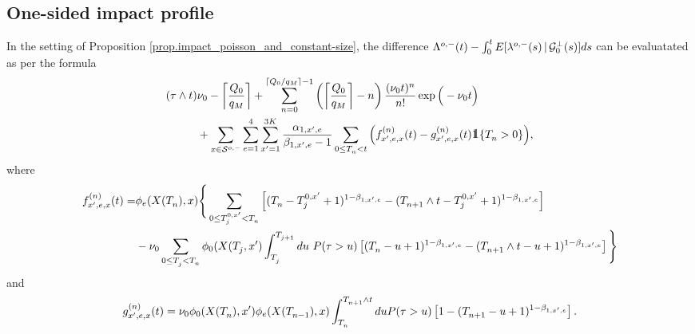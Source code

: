 \documentclass[10pt, article,table]{article}
\begin{document}
\newpage

\subsection{One-sided impact profile}
\begin{lemma}\label{lemma.implementation_of_one-sided_impact}
 In the setting of Proposition \ref{prop.impact_poisson_and_constant-size}, the difference $\weakDeflCompensator(t) - \intzerot \Expectation[\weakDeflIntensity(s)\,\vert\,\sigmaAlgebraG_{0}\orthogonal(s)]ds$ can be evaluatated as per the formula
 \begin{equation}\label{eq.evaluation_of_one-sided_impact}
 \begin{split}
  (\terminationTime\wedge t) &\baseRate_{0}
  - \left\lceil \frac{\metaorderSize}{q_{M}}\right\rceil
  + \sum_{n=0}^{\lceil\metaorderSize/q_{M}\rceil -1}
  \left( \left\lceil \frac{\metaorderSize}{q_{M}}\right\rceil - n\right)\frac{(\baseRate_{0} t)^n}{n!} \exp \Big( - \baseRate_{0} t \Big)
  \\
  &+
  \sum_{x\in\weakDeflSpace}\sum_{e=1}^{4}\sum_{\xone=1}^{3K}
  \frac{\impCoef_{1,\xone,e}}{\decCoef_{1,\xone,e} -1}
  \sum_{0\leq \arrivalTimes[]_n < t}
  \Big(
  f^{(n)}_{\xone,e,x}(t) - g^{(n)}_{\xone,e,x}(t) \one\lbrace \arrivalTimes[]_n >0\rbrace
  \Big),
  \end{split}
 \end{equation}
where 
\begin{equation*}
\begin{split}
 f^{(n)}_{\xone,e,x} (t)
 =&
 \transProb_{e} (\stateVariable(\arrivalTimes[]_n),x)
 \Bigg\lbrace
 \sum_{0\leq \arrivalTimes[0,\xone]_j < \arrivalTimes[]_n}
 \left[
 (\arrivalTimes[]_n - \arrivalTimes[0,\xone]_j +1)^{1-\decCoef_{1,\xone,e}}
 -
 (\arrivalTimes[]_{n+1}\wedge t - \arrivalTimes[0,\xone]_j +1)^{1-\decCoef_{1,\xone,e}}
 \right]
 \\
 &-
 \baseRate_{0} \sum_{0\leq \arrivalTimes[]_j < \arrivalTimes[]_n}
 \transProb_{0}(\stateVariable(\arrivalTimes[]_j,\xone)
 \int_{\arrivalTimes[]_j}^{\arrivalTimes[]_{j+1}}
 du \, \,  \Prob(\terminationTime>u)
 \left[
 (\arrivalTimes[]_n - u +1)^{1-\decCoef_{1,\xone,e}}
 -
 (\arrivalTimes[]_{n+1}\wedge t - u +1)^{1-\decCoef_{1,\xone,e}}
 \right]
 \Bigg\rbrace
 \end{split}
\end{equation*}
and 
\begin{equation*}
 g^{(n)}_{\xone,e,x} (t) = 
 \baseRate_{0} \transProb_{0} (\stateVariable(\arrivalTimes[]_{n}),\xone)\transProb_{e} (\stateVariable(\arrivalTimes[]_{n-1}),x)
 \int_{\arrivalTimes[]_n}^{\arrivalTimes[]_{n+1}\wedge t}
 du \Prob(\terminationTime>u)
 \left[
 1 -
 (\arrivalTimes[]_{n+1} - u +1)^{1-\decCoef_{1,\xone,e}}
 \right].
\end{equation*}
\end{lemma}
\end{document}
